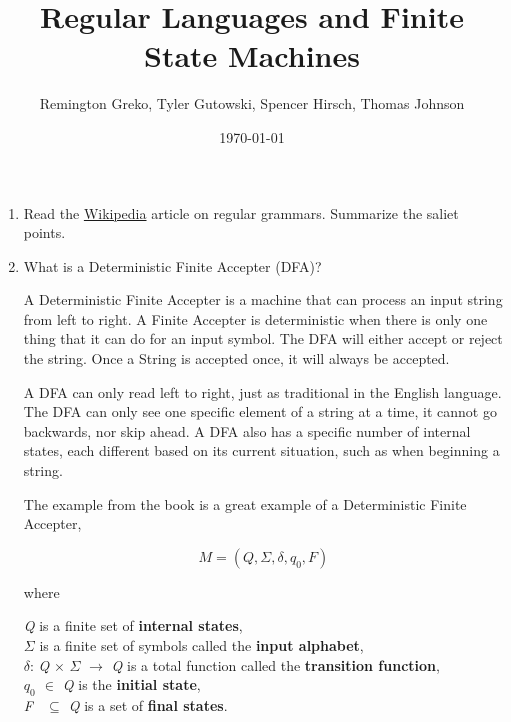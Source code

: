\documentclass{article}
\begin{document}
\title{Regular Languages and Finite State Machines}
\author{Remington Greko, Tyler Gutowski, Spencer Hirsch, Thomas Johnson}
\date{\today}

\maketitle

\begin{enumerate}
    \item Read the \href{https://en.wikipedia.org/wiki/Regular_grammar}{Wikipedia} article on regular grammars. Summarize
            the saliet points.

    \medskip


    \medskip

    \item What is a Deterministic Finite Accepter (DFA)?
    
    \medskip

    \-\hspace{0.5cm} A Deterministic Finite Accepter is a machine that can process an input
    string from left to right. A Finite Accepter is deterministic when there is only one thing
    that it can do for an input symbol. The DFA will either accept or reject the string. Once
    a String is accepted once, it will always be accepted. 

    \-\hspace{0.5cm} A DFA can only read left to right, just as traditional in the English
    language. The DFA can only see one specific element of a string at a time, it cannot go 
    backwards, nor skip ahead. A DFA also has a specific number of internal states, each
    different based on its current situation, such as when beginning a string. 

    \-\hspace{0.5cm} The example from the book is a great example of a Deterministic Finite Accepter,
    
    \[M = (Q, \Sigma, \delta, q_0, F)\]

    where

    \smallskip

    \-\hspace{0.5cm} \textit{Q} is a finite set of \textbf{internal states}, \\
    \-\hspace{0.5cm} $\Sigma$ is a finite set of symbols called the \textbf{input alphabet}, \\
    \-\hspace{0.5cm} $\delta$: \textit{Q} $\times$ $\Sigma$ $\rightarrow$ \textit{Q} is a total function called the 
    \textbf{transition function}, \\
    \-\hspace{0.5cm} \textit{$q_0$ $\in$ Q} is the \textbf{initial state}, \\
    \-\hspace{0.5cm} \textit{F \ $\subseteq$ Q} is a set of \textbf{final states}.




\end{enumerate}
\end{document}
